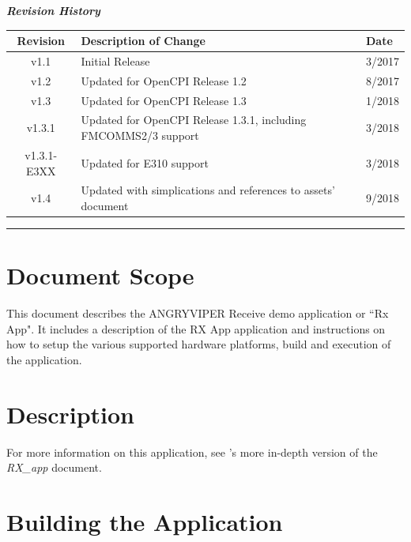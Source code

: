 \maketitle
\newpage
	\begin{center}
	\textit{\textbf{Revision History}}
		\begin{table}[H]
		\label{table:revisions} %
			\begin{tabularx}{\textwidth}{|c|X|l|}
			\hline
			\rowcolor{blue}
			\textbf{Revision} & \textbf{Description of Change} & \textbf{Date} \\
		    \hline
		    v1.1 & Initial Release & 3/2017 \\
		    \hline
		    v1.2 & Updated for OpenCPI Release 1.2 & 8/2017 \\
			\hline
			v1.3 & Updated for OpenCPI Release 1.3 & 1/2018 \\
			\hline
			v1.3.1 & Updated for OpenCPI Release 1.3.1, including FMCOMMS2/3 support & 3/2018 \\
			\hline
			v1.3.1-E3XX & Updated for E310 support & 3/2018 \\
			\hline
			v1.4 & Updated with simplications and references to assets' document & 9/2018 \\
			\hline
			\end{tabularx}
		\end{table}
	\end{center}

\newpage
\tableofcontents
\pagebreak
\vspace{1pc}
\hrule
\def\assetsdoc{\noindent For more information on this application, see \code{ocpi.assets}'s more in-depth version of the \textit{RX\_app} document.}
\section{Document Scope}
This document describes the ANGRYVIPER Receive demo application or ``Rx App". It includes a description of the RX App application and instructions on how to setup the various supported hardware platforms, build and execution of the application.

\section{Description}
\assetsdoc
\section{Building the Application}
